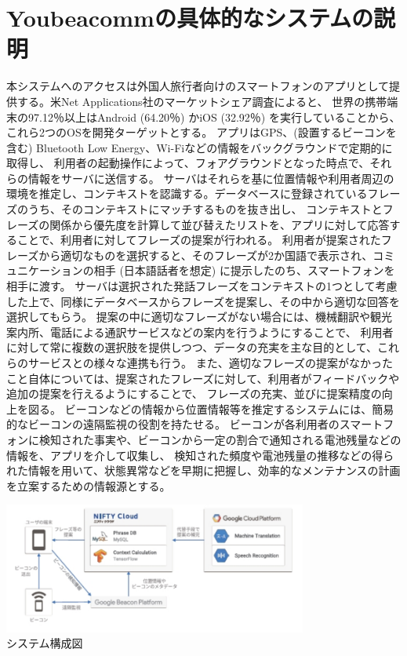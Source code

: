 \documentclass[11pt,papersize]{jsbook}
\begin{document}
\section{Youbeacommの具体的なシステムの説明}
 本システムへのアクセスは外国人旅行者向けのスマートフォンのアプリとして提供する。米Net Applications社のマーケットシェア調査\cite{b}によると、
世界の携帯端末の97.12％以上はAndroid (64.20％) かiOS (32.92％) を実行していることから、これら2つのOSを開発ターゲットとする。
アプリはGPS、(設置するビーコンを含む) Bluetooth Low Energy、Wi-Fiなどの情報をバックグラウンドで定期的に取得し、
利用者の起動操作によって、フォアグラウンドとなった時点で、それらの情報をサーバに送信する。
サーバはそれらを基に位置情報や利用者周辺の環境を推定し、コンテキストを認識する。データベースに登録されているフレーズのうち、そのコンテキストにマッチするものを抜き出し、
コンテキストとフレーズの関係から優先度を計算して並び替えたリストを、アプリに対して応答することで、利用者に対してフレーズの提案が行われる。
利用者が提案されたフレーズから適切なものを選択すると、そのフレーズが2か国語で表示され、コミュニケーションの相手 (日本語話者を想定) に提示したのち、スマートフォンを相手に渡す。
サーバは選択された発話フレーズをコンテキストの1つとして考慮した上で、同様にデータベースからフレーズを提案し、その中から適切な回答を選択してもらう。
提案の中に適切なフレーズがない場合には、機械翻訳や観光案内所、電話による通訳サービスなどの案内を行うようにすることで、
利用者に対して常に複数の選択肢を提供しつつ、データの充実を主な目的として、これらのサービスとの様々な連携も行う。
また、適切なフレーズの提案がなかったこと自体については、提案されたフレーズに対して、利用者がフィードバックや追加の提案を行えるようにすることで、
フレーズの充実、並びに提案精度の向上を図る。
ビーコンなどの情報から位置情報等を推定するシステムには、簡易的なビーコンの遠隔監視の役割を持たせる。
ビーコンが各利用者のスマートフォンに検知された事実や、ビーコンから一定の割合で通知される電池残量などの情報を、アプリを介して収集し、
検知された頻度や電池残量の推移などの得られた情報を用いて、状態異常などを早期に把握し、効率的なメンテナンスの計画を立案するための情報源とする。
\begin{center}
\includegraphics[width=10cm]{bcd.pdf}\\
システム構成図
\end{center}
\end{document}
